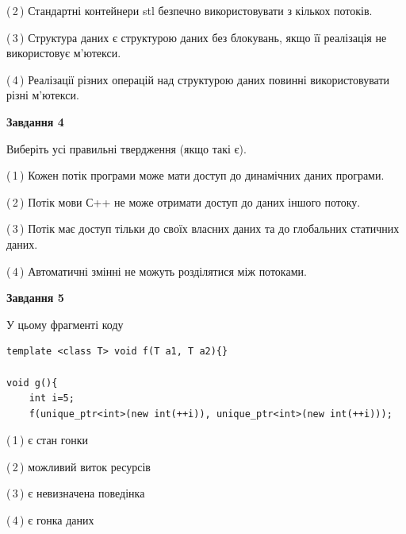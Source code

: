 \documentclass[12pt, ukrainian]{article}
\begin{document}
\begin {large}
{(\,2\,) Стандартні контейнери stl безпечно використовувати з кількох потоків.%

(\,3\,) Структура даних є структурою даних без блокувань, якщо її реалізація не використовує м’ютекси.%

(\,4\,) Реалізації різних операцій над структурою даних повинні використовувати різні м’ютекси.%



\begin{center}
\textbf{Завдання 4}
\end{center}
Виберіть усі правильні твердження (якщо такі є).\par
\vspace{2mm}

(\,1\,) Кожен потік програми може мати доступ до динамічних даних програми.%

(\,2\,) Потік мови С++ не може отримати доступ до даних іншого потоку.%

(\,3\,) Потік має доступ тільки до своїх власних даних та до глобальних статичних даних.%

(\,4\,) Автоматичні змінні не можуть розділятися між потоками.%



\begin{center}
\textbf{Завдання 5}
\end{center}
У цьому фрагменті коду
\begin{verbatim}
template <class T> void f(T a1, T a2){}

void g(){
    int i=5;
    f(unique_ptr<int>(new int(++i)), unique_ptr<int>(new int(++i)));
\end{verbatim}

(\,1\,) є стан гонки%

(\,2\,) можливий виток ресурсів%

(\,3\,) є невизначена поведінка%

(\,4\,) є гонка даних%


}
\end {large}
\end{document}

